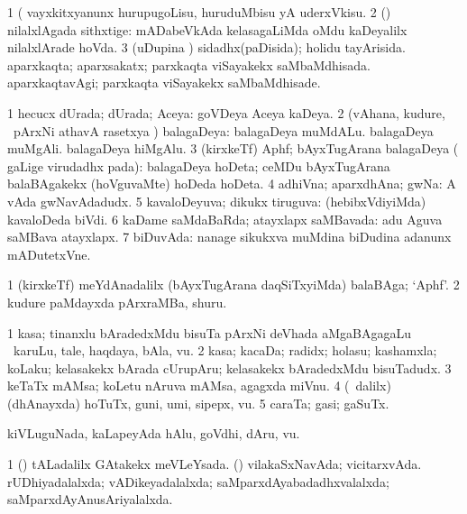 \noindent
\gl{\pagu}
\bmng
\bnum
\num{1}  (  vayxkitxyanunx hurupugoLisu, huruduMbisu yA uderxVkisu. 
\num{2}  (\AmA) nilalxlAgada sithxtige:  mADabeVkAda kelasagaLiMda oMdu kaDeyalilx nilalxlArade hoVda. 
\num{3}  (uDupina \vi) sidadhx(paDisida); holidu tayArisida. 
  
\banum
{} aparxkaqta; aparxsakatx; parxkaqta viSayakekx saMbaMdhisada. 
 aparxkaqtavAgi; parxkaqta viSayakekx saMbaMdhisade. 
\eanum
\numie
\enum
\emng
\eentry

\bentry
{}
\gl{\gu}
\bmng
\bnum
\num{1} hecucx dUrada; dUrada; Aceya:  goVDeya Aceya kaDeya. 
\num{2} (vAhana, kudure, \mo\ pArxNi athavA rasetxya \vi) balagaDeya:  balagaDeya muMdALu.  balagaDeya muMgAli.  balagaDeya hiMgAlu. 
\num{3} (kirxkeTf) Aphf; bAyxTugArana balagaDeya ( gaLige virudadhx pada):  balagaDeya hoDeta; ceMDu bAyxTugArana balaBAgakekx (hoVguvaMte) hoDeda hoDeta. 
\num{4} adhiVna; aparxdhAna; gwNa:  A vAda gwNavAdadudx. 
\num{5} kavaloDeyuva; dikukx tiruguva:  (hebibxVdiyiMda) kavaloDeda biVdi. 
\num{6} kaDame saMdaBaRda; atayxlapx saMBavada:  adu Aguva saMBava atayxlapx. 
\num{7} biDuvAda:  nanage sikukxva muMdina biDudina adanunx mADutetxVne. 
\enum
\emng
\eentry

\bentry
{}
\gl{\nA}
\bmng
\bnum
\num{1} (kirxkeTf) meYdAnadalilx (bAyxTugArana daqSiTxyiMda) balaBAga; `Aphf'. 
\num{2} kudure paMdayxda pArxraMBa, shuru. 
\enum
\emng
\eentry

\bentry
{}
\gl{\nA}
\bmng
\bnum
\num{1} kasa; tinanxlu bAradedxMdu bisuTa pArxNi deVhada aMgaBAgagaLu \kanmu\ karuLu, tale, haqdaya, bAla, \mo vu. 
\num{2} kasa; kacaDa; radidx; holasu; kashamxla; koLaku; kelasakekx bArada cUrupAru; kelasakekx bAradedxMdu bisuTadudx. 
\num{3} keTaTx mAMsa; koLetu nAruva mAMsa, agagxda miVnu. 
\num{4} (\sA\ \bava dalilx) (dhAnayxda) hoTuTx, guni, umi, sipepx, \mo vu. 
\num{5} caraTa; gasi; gaSuTx. 
\enum
\emng

\noindent
\gl{\pagu}
\bmng
{} kiVLuguNada, kaLapeyAda hAlu, goVdhi, dAru, \mo vu. 
\emng
\eentry

\bentry
{}
\gl{\gu}
\bmng
\bnum
\num{1} (\saM) tALadalilx GAtakekx meVLeYsada. 
 (\rUpa) 
\banum
{} vilakaSxNavAda; vicitarxvAda. 
 rUDhiyadalalxda; vADikeyadalalxda; saMparxdAyabadadhxvalalxda; saMparxdAyAnusAriyalalxda. 
\eanum
\numie
\enum
\emng
\eentry

